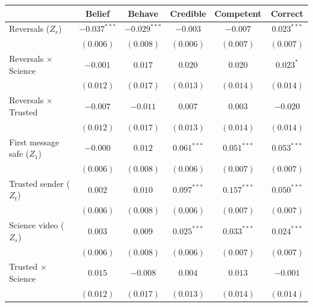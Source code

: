 
\begin{table}
\begin{center}
\begin{tabular}{l c c || c c || c}
\hline
 & Belief & Behave & Credible & Competent & Correct \\
\hline
Reversals ($Z_r$)                      & $-0.037^{***}$ & $-0.029^{***}$ & $-0.003$       & $-0.007$       & $0.023^{***}$  \\
                                       & $(0.006)$      & $(0.008)$      & $(0.006)$      & $(0.007)$      & $(0.007)$      \\
Reversals $\times$ Science             & $-0.001$       & $0.017$        & $0.020$        & $0.020$        & $0.023^{*}$    \\
                                       & $(0.012)$      & $(0.017)$      & $(0.013)$      & $(0.014)$      & $(0.014)$      \\
Reversals $\times$ Trusted             & $-0.007$       & $-0.011$       & $0.007$        & $0.003$        & $-0.020$       \\
                                       & $(0.012)$      & $(0.017)$      & $(0.013)$      & $(0.014)$      & $(0.014)$      \\
First message safe ($Z_1$)             & $-0.000$       & $0.012$        & $0.061^{***}$  & $0.051^{***}$  & $0.053^{***}$  \\
                                       & $(0.006)$      & $(0.008)$      & $(0.006)$      & $(0.007)$      & $(0.007)$      \\
Trusted sender ($Z_t$)                 & $0.002$        & $0.010$        & $0.097^{***}$  & $0.157^{***}$  & $0.050^{***}$  \\
                                       & $(0.006)$      & $(0.008)$      & $(0.006)$      & $(0.007)$      & $(0.007)$      \\
Science video ($Z_s$)                  & $0.003$        & $0.009$        & $0.025^{***}$  & $0.033^{***}$  & $0.024^{***}$  \\
                                       & $(0.006)$      & $(0.008)$      & $(0.006)$      & $(0.007)$      & $(0.007)$      \\
Trusted $\times$ Science               & $0.015$        & $-0.008$       & $0.004$        & $0.013$        & $-0.001$       \\
                                       & $(0.012)$      & $(0.017)$      & $(0.013)$      & $(0.014)$      & $(0.014)$      \\

\end{tabular}
\end{center}
\end{table}
